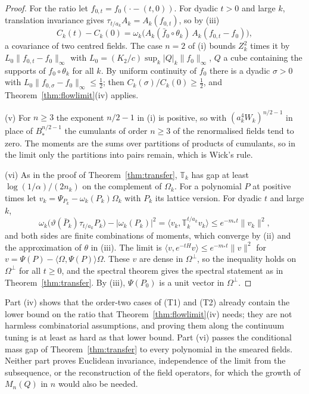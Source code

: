 \documentclass[11pt]{amsart}
\theoremstyle{definition}
\theoremstyle{remark}
\numberwithin{equation}{section}
\newcommand{\ip}[2]{\langle #1,#2\rangle}
\begin{document}
\begin{proof}
For the ratio let $f_{0,t}=f_0(\cdot-(t,0))$. For dyadic $t>0$ and large
$k$, translation invariance gives $\tau_{t/a_k}A_k=A_k(f_{0,t})$, so by
(iii)
\[
C_k(t)-C_k(0)=\omega_k\bigl(A_k(\bar f_0\circ\theta_k)\,
A_k(f_{0,t}-f_0)\bigr),
\]
a covariance of two centred fields. The case $n=2$ of (i) bounds $Z_k^2$
times it by $L_0\|f_{0,t}-f_0\|_\infty$ with
$L_0=(K_2/c)\sup_k|Q|_k\|f_0\|_\infty$, $Q$ a cube containing the supports
of $f_0\circ\theta_k$ for all $k$. By uniform continuity of $f_0$ there is a
dyadic $\sigma>0$ with $L_0\|f_{0,\sigma}-f_0\|_\infty\le\frac12$; then
$C_k(\sigma)/C_k(0)\ge\frac12$, and Theorem~\ref{thm:flowlimit}(iv) applies.

(v) For $n\ge3$ the exponent $n/2-1$ in (i) is positive, so with
$(a_k^4W_k)^{n/2-1}$ in place of $B_*^{n/2-1}$ the cumulants of order $n\ge3$ of
the renormalised fields tend to zero. The moments are the sums over partitions
of products of cumulants, so in the limit only the partitions into pairs
remain, which is Wick's rule.

(vi) As in the proof of Theorem~\ref{thm:transfer}, $\mathbb T_k$ has gap at
least $\log(1/\alpha)/(2n_k)$ on the complement of $\Omega_k$. For a
polynomial $P$ at positive times let $v_k=\Psi_{P_k}-\omega_k(P_k)\Omega_k$
with $P_k$ its lattice version. For dyadic $t$ and large $k$,
\[
\omega_k\bigl(\vartheta(\bar P_k)\tau_{t/a_k}P_k\bigr)-|\omega_k(P_k)|^2
=\ip{v_k}{\mathbb T_k^{t/a_k}v_k}\le e^{-m_*t}\|v_k\|^2 ,
\]
and both sides are finite combinations of moments, which converge by (ii)
and the approximation of $\theta$ in (iii). The limit is
$\ip v{e^{-tH}v}\le e^{-m_*t}\|v\|^2$ for $v=\Psi(P)-\ip\Omega{\Psi(P)}\Omega$.
These $v$ are dense in $\Omega^\perp$, so the inequality holds on
$\Omega^\perp$ for all $t\ge0$, and the spectral theorem gives the spectral
statement as in Theorem~\ref{thm:transfer}. By (iii), $\Psi(P_0)$ is a unit
vector in $\Omega^\perp$.
\end{proof}

Part (iv) shows that the order-two cases of (T1) and (T2) already contain
the lower bound on the ratio that Theorem~\ref{thm:flowlimit}(iv) needs; they
are not harmless combinatorial assumptions, and proving them along the
continuum tuning is at least as hard as that lower bound. Part (vi) passes the
conditional mass gap of Theorem~\ref{thm:transfer} to every polynomial in the
smeared fields. Neither part proves Euclidean invariance, independence of the
limit from the subsequence, or the reconstruction of the field operators,
for which the growth of $M_n(Q)$ in $n$ would also be needed.
\end{document}
